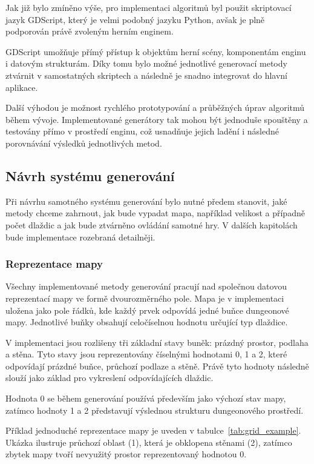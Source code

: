 \documentclass[
  program=itk,
  biblatex,
  figures=false,
  glossaries,
  index
]{kidiplom}
\begin{document}
Jak již bylo zmíněno výše, pro implementaci algoritmů byl použit skriptovací jazyk GDScript, který je velmi podobný jazyku Python, avšak je plně podporován právě zvoleným herním enginem.

GDScript umožňuje přímý přístup k objektům herní scény, komponentám enginu i datovým strukturám. Díky tomu bylo možné jednotlivé generovací metody ztvárnit v samostatných skriptech a následně je snadno integrovat do hlavní aplikace.

Další výhodou je možnost rychlého prototypování a průběžných úprav algoritmů během vývoje. Implementované generátory tak mohou být jednoduše spouštěny a testovány přímo v prostředí enginu, což usnadňuje jejich ladění i následné porovnávání výsledků jednotlivých metod.


\subsection{Návrh systému generování}
Při návrhu samotného systému generování bylo nutné předem stanovit, jaké metody chceme zahrnout, jak bude vypadat mapa, například velikost a případně počet dlaždic a jak bude ztvárněno ovládání samotné hry. V dalších kapitolách bude implementace rozebraná detailněji.

\subsubsection{Reprezentace mapy}
Všechny implementované metody generování pracují nad společnou datovou reprezentací mapy ve formě dvourozměrného pole. Mapa je v implementaci uložena jako pole řádků, kde každý prvek odpovídá jedné buňce dungeonové mapy. Jednotlivé buňky obsahují celočíselnou hodnotu určující typ dlaždice.

V implementaci jsou rozlišeny tři základní stavy buněk: prázdný prostor, podlaha a stěna. Tyto stavy jsou reprezentovány číselnými hodnotami 0, 1 a 2, které odpovídají prázdné buňce, průchozí podlaze a stěně. Právě tyto hodnoty následně slouží jako základ pro vykreslení odpovídajících dlaždic.

Hodnota 0 se během generování používá především jako výchozí stav mapy, 
zatímco hodnoty 1 a 2 představují výslednou strukturu dungeonového prostředí.

Příklad jednoduché reprezentace mapy je uveden v tabulce~\ref{tab:grid_example}. 
Ukázka ilustruje průchozí oblast (1), která je obklopena stěnami (2), zatímco 
zbytek mapy tvoří nevyužitý prostor reprezentovaný hodnotou 0.
\end{document}

